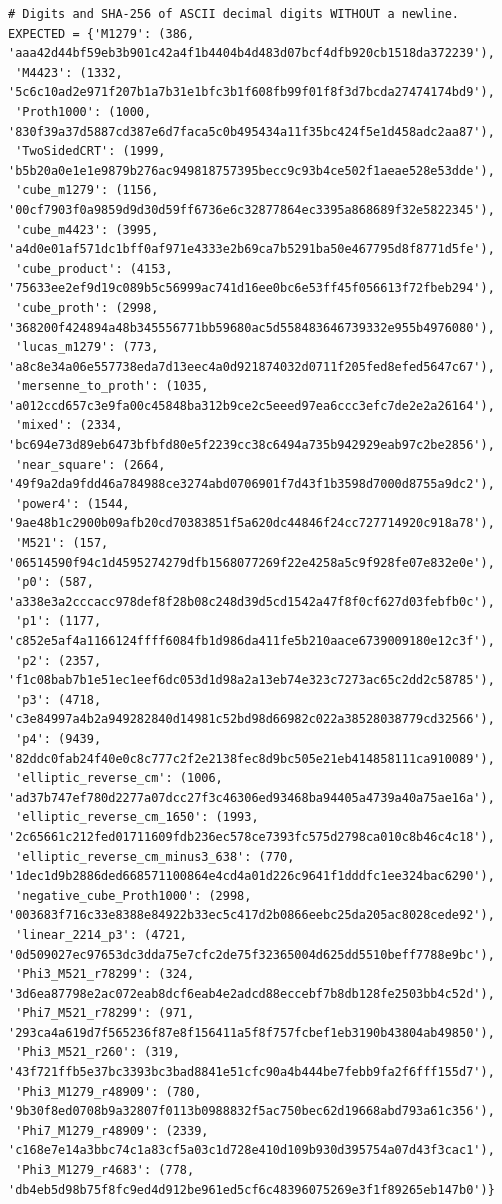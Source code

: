 \documentclass[11pt,a4paper]{article}
\theoremstyle{definition}\newtheorem{definition}[theorem]{Definition}
\theoremstyle{remark}\newtheorem{remark}[theorem]{Remark}
\begin{document}
\begin{lstlisting}[label=lst:verifier]
# Digits and SHA-256 of ASCII decimal digits WITHOUT a newline.
EXPECTED = {'M1279': (386, 'aaa42d44bf59eb3b901c42a4f1b4404b4d483d07bcf4dfb920cb1518da372239'),
 'M4423': (1332, '5c6c10ad2e971f207b1a7b31e1bfc3b1f608fb99f01f8f3d7bcda27474174bd9'),
 'Proth1000': (1000, '830f39a37d5887cd387e6d7faca5c0b495434a11f35bc424f5e1d458adc2aa87'),
 'TwoSidedCRT': (1999, 'b5b20a0e1e1e9879b276ac949818757395becc9c93b4ce502f1aeae528e53dde'),
 'cube_m1279': (1156, '00cf7903f0a9859d9d30d59ff6736e6c32877864ec3395a868689f32e5822345'),
 'cube_m4423': (3995, 'a4d0e01af571dc1bff0af971e4333e2b69ca7b5291ba50e467795d8f8771d5fe'),
 'cube_product': (4153, '75633ee2ef9d19c089b5c56999ac741d16ee0bc6e53ff45f056613f72fbeb294'),
 'cube_proth': (2998, '368200f424894a48b345556771bb59680ac5d558483646739332e955b4976080'),
 'lucas_m1279': (773, 'a8c8e34a06e557738eda7d13eec4a0d921874032d0711f205fed8efed5647c67'),
 'mersenne_to_proth': (1035, 'a012ccd657c3e9fa00c45848ba312b9ce2c5eeed97ea6ccc3efc7de2e2a26164'),
 'mixed': (2334, 'bc694e73d89eb6473bfbfd80e5f2239cc38c6494a735b942929eab97c2be2856'),
 'near_square': (2664, '49f9a2da9fdd46a784988ce3274abd0706901f7d43f1b3598d7000d8755a9dc2'),
 'power4': (1544, '9ae48b1c2900b09afb20cd70383851f5a620dc44846f24cc727714920c918a78'),
 'M521': (157, '06514590f94c1d4595274279dfb1568077269f22e4258a5c9f928fe07e832e0e'),
 'p0': (587, 'a338e3a2cccacc978def8f28b08c248d39d5cd1542a47f8f0cf627d03febfb0c'),
 'p1': (1177, 'c852e5af4a1166124ffff6084fb1d986da411fe5b210aace6739009180e12c3f'),
 'p2': (2357, 'f1c08bab7b1e51ec1eef6dc053d1d98a2a13eb74e323c7273ac65c2dd2c58785'),
 'p3': (4718, 'c3e84997a4b2a949282840d14981c52bd98d66982c022a38528038779cd32566'),
 'p4': (9439, '82ddc0fab24f40e0c8c777c2f2e2138fec8d9bc505e21eb414858111ca910089'),
 'elliptic_reverse_cm': (1006, 'ad37b747ef780d2277a07dcc27f3c46306ed93468ba94405a4739a40a75ae16a'),
 'elliptic_reverse_cm_1650': (1993, '2c65661c212fed01711609fdb236ec578ce7393fc575d2798ca010c8b46c4c18'),
 'elliptic_reverse_cm_minus3_638': (770, '1dec1d9b2886ded668571100864e4cd4a01d226c9641f1dddfc1ee324bac6290'),
 'negative_cube_Proth1000': (2998, '003683f716c33e8388e84922b33ec5c417d2b0866eebc25da205ac8028cede92'),
 'linear_2214_p3': (4721, '0d509027ec97653dc3dda75e7cfc2de75f32365004d625dd5510beff7788e9bc'),
 'Phi3_M521_r78299': (324, '3d6ea87798e2ac072eab8dcf6eab4e2adcd88eccebf7b8db128fe2503bb4c52d'),
 'Phi7_M521_r78299': (971, '293ca4a619d7f565236f87e8f156411a5f8f757fcbef1eb3190b43804ab49850'),
 'Phi3_M521_r260': (319, '43f721ffb5e37bc3393bc3bad8841e51cfc90a4b444be7febb9fa2f6fff155d7'),
 'Phi3_M1279_r48909': (780, '9b30f8ed0708b9a32807f0113b0988832f5ac750bec62d19668abd793a61c356'),
 'Phi7_M1279_r48909': (2339, 'c168e7e14a3bbc74c1a83cf5a03c1d728e410d109b930d395754a07d43f3cac1'),
 'Phi3_M1279_r4683': (778, 'db4eb5d98b75f8fc9ed4d912be961ed5cf6c48396075269e3f1f89265eb147b0')}


\end{lstlisting}
\end{document}
